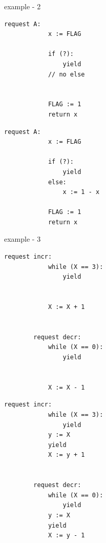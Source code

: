 





\vspace{2em}
example - 2

\noindent
\begin{minipage}[t]{0.45\textwidth}
	\begin{lstlisting}[caption={Not serializable: {(A,0),(A,0)}}]
		request A: 
		    x := FLAG 
		
		    if (?): 
		        yield
		    // no else
		
		
		    FLAG := 1 
		    return x
	\end{lstlisting}
\end{minipage}%
\hfill
\begin{minipage}[t]{0.45\textwidth}
	\begin{lstlisting}[caption={Serializable}]
		request A: 
		    x := FLAG
		
		    if (?):
		        yield
		    else:
		        x := 1 - x
		
		    FLAG := 1
		    return x
	\end{lstlisting}
\end{minipage}

\vspace{2em}
\newpage
example - 3

\noindent
\begin{minipage}[t]{0.45\textwidth}
	\begin{lstlisting}[caption={Fred (serializable)}]
		request incr: 
		    while (X == 3):
		        yield
		        
		        
		    X := X + 1
		
		
		request decr: 
		    while (X == 0): 
		        yield
		        
		        
		    X := X - 1
	\end{lstlisting}
\end{minipage}
\hfill
\begin{minipage}[t]{0.45\textwidth}
	\begin{lstlisting}[caption={Fred2 (not serializable)}]
		request incr:
		    while (X == 3):
		        yield
		    y := X
		    yield
		    X := y + 1
		
		
		request decr: 
		    while (X == 0):
		        yield
		    y := X
		    yield
		    X := y - 1
	\end{lstlisting}
\end{minipage}
	

